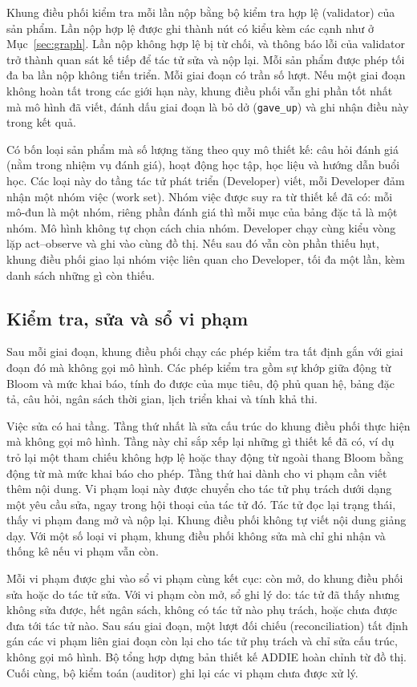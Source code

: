\documentclass[conference,a4paper]{IEEEtran}
\begin{document}
Khung điều phối kiểm tra mỗi lần nộp bằng bộ kiểm tra hợp lệ (validator) của sản
phẩm. Lần nộp hợp lệ được ghi thành nút có kiểu kèm các cạnh như ở
Mục~\ref{sec:graph}. Lần nộp không hợp lệ bị từ chối, và thông báo lỗi của
validator trở thành quan sát kế tiếp để tác tử sửa và nộp lại. Mỗi sản phẩm được phép tối đa ba lần nộp không tiến triển. Mỗi giai đoạn có trần số lượt. Nếu một giai đoạn không hoàn tất
trong các giới hạn này, khung điều phối vẫn ghi phần tốt nhất mà mô hình đã viết,
đánh dấu giai đoạn là bỏ dở (\texttt{gave\_up}) và ghi nhận điều này trong kết quả.

Có bốn loại sản phẩm mà số lượng tăng theo quy mô thiết kế: câu hỏi đánh giá (nằm
trong nhiệm vụ đánh giá), hoạt động học tập, học liệu và hướng dẫn buổi học. Các
loại này do tầng tác tử phát triển (Developer) viết, mỗi Developer đảm nhận một
nhóm việc (work set). Nhóm việc được suy ra từ thiết kế đã có: mỗi mô-đun là một
nhóm, riêng phần đánh giá thì mỗi mục của bảng đặc tả là một nhóm. Mô hình không
tự chọn cách chia nhóm. Developer chạy cùng kiểu vòng lặp act--observe và
ghi vào cùng đồ thị. Nếu sau đó vẫn còn phần thiếu hụt, khung điều phối giao lại nhóm việc liên quan cho Developer, tối đa một lần, kèm danh sách những gì còn thiếu.

\subsection{Kiểm tra, sửa và sổ vi phạm}
\label{sec:repair}

Sau mỗi giai đoạn, khung điều phối chạy các phép kiểm tra tất định gắn với giai
đoạn đó mà không gọi mô hình. Các phép kiểm tra gồm sự khớp giữa động từ Bloom và mức khai báo, tính đo được của mục tiêu,
độ phủ quan hệ, bảng đặc tả, câu hỏi, ngân sách thời gian, lịch triển khai và tính khả thi.

Việc sửa có hai tầng. Tầng thứ nhất là sửa cấu trúc do khung điều phối thực hiện
mà không gọi mô hình. Tầng này chỉ sắp xếp lại những gì thiết kế đã có, ví dụ trỏ
lại một tham chiếu không hợp lệ hoặc thay động từ ngoài thang Bloom bằng động từ
mà mức khai báo cho phép. Tầng thứ hai dành cho vi phạm cần viết thêm nội dung.
Vi phạm loại này được chuyển cho tác tử phụ trách dưới dạng một yêu cầu sửa, ngay trong hội
thoại của tác tử đó. Tác tử đọc lại trạng thái, thấy vi phạm đang mở và nộp lại.
Khung điều phối không tự viết nội dung giảng dạy. Với một số loại vi phạm, khung điều phối không sửa mà chỉ ghi nhận và thống kê nếu vi phạm vẫn còn.

Mỗi vi phạm được ghi vào sổ vi phạm cùng kết cục: còn mở, do
khung điều phối sửa hoặc do tác tử sửa. Với vi phạm còn mở, sổ ghi lý do: tác tử
đã thấy nhưng không sửa được, hết ngân sách, không có tác tử nào phụ trách, hoặc chưa được đưa tới tác tử nào. Sau sáu giai đoạn, một lượt đối chiếu (reconciliation) tất
định gán các vi phạm liên giai đoạn còn lại cho tác tử phụ trách và chỉ sửa cấu trúc, không gọi mô hình. Bộ tổng hợp dựng bản thiết kế ADDIE hoàn chỉnh từ đồ thị. Cuối cùng, bộ kiểm toán (auditor) ghi lại các vi phạm
chưa được xử lý.
\end{document}
